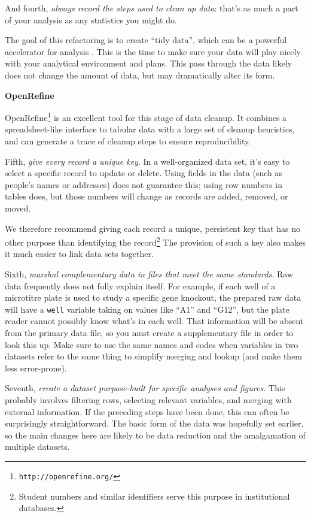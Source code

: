 \documentclass[10pt]{article}
\newcommand{\recommend}[1]{\textit{#1}}
\newcommand{\withurl}[2]{{#1}\footnote{\texttt{#2}}}
\begin{document}
And fourth, \recommend{always record the steps used to clean up data}:
that's as much a part of your analysis as any statistics you might do.

The goal of this refactoring is to create ``tidy data'', which can be
a powerful accelerator for analysis \cite{wickham2014,hart2015}. This
is the time to make sure your data will play nicely with your
analytical environment and plans. This pass through the data likely
does not change the amount of data, but may dramatically alter its
form.

\begin{framed}
\noindent \textbf{OpenRefine}

\withurl{OpenRefine}{http://openrefine.org/} is an excellent tool for
this stage of data cleanup. It combines a spreadsheet-like interface
to tabular data with a large set of cleanup heuristics, and can
generate a trace of cleanup steps to ensure reproducibility.
\end{framed}

Fifth, \recommend{give every record a unique key}.  In a
well-organized data set, it's easy to select a specific record to
update or delete.  Using fields in the data (such as people's names or
addresses) does not guarantee this; using row numbers in tables does,
but those numbers will change as records are added, removed, or moved.

We therefore recommend giving each record a unique, persistent key
that has no other purpose than identifying the record\footnote{Student
  numbers and similar identifiers serve this purpose in institutional
  databases.} The provision of such a key also makes it much easier to
link data sets together.

Sixth, \recommend{marshal complementary data in files that meet the
  same standards}.  Raw data frequently does not fully explain
itself. For example, if each well of a microtitre plate is used to
study a specific gene knockout, the prepared raw data will have a
\texttt{well} variable taking on values like ``A1'' and ``G12'', but
the plate reader cannot possibly know what's in each well. That
information will be absent from the primary data file, so you must
create a supplementary file in order to look this up. Make sure to use
the same names and codes when variables in two datasets refer to the
same thing to simplify merging and lookup (and make them less
error-prone).

Seventh, \recommend{create a dataset purpose-built for specific analyses
  and figures.}  This probably involves filtering rows, selecting
relevant variables, and merging with external information. If the
preceding steps have been done, this can often be surprisingly
straightforward. The basic form of the data was hopefully set earlier,
so the main changes here are likely to be data reduction and the
amalgamation of multiple datasets.
\end{document}
